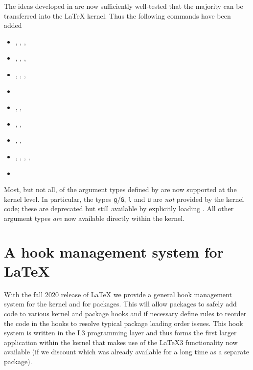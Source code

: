 \documentclass{ltnews}
\begin{document}
The ideas developed in  are now sufficiently well-tested
that the majority can be transferred into the \LaTeX{} kernel. Thus
the following commands have been added
\begin{itemize}
  \item {}, ,
    , 
  \item {}, ,
    , 
  \item {}, ,
    , 
  \item {} 
  \item {}, , 
  \item {}, , 
  \item {}, , 
  \item {}, , ,
    , 
  \item {}
\end{itemize}

Most, but not all, of the argument types defined by  are
now supported at the kernel level. In particular, the types
\texttt{g}/\texttt{G}, \texttt{l} and \texttt{u} are \emph{not} provided by
the kernel code; these are deprecated but still available by
explicitly loading . All other argument types \emph{are}
now available directly within the \LaTeXe{} kernel.






\section{A hook management system for \LaTeX{}}

With the fall 2020 release of \LaTeX{} we provide a general hook
management system for the kernel and for packages. This will allow
packages to safely add code to various kernel and package hooks and if
necessary define rules to reorder the code in the hooks to resolve
typical package loading order issues.  This hook system is written in
the L3 programming layer and thus forms the first larger application
within the kernel that makes use of the \LaTeX3 functionality now
available (if we discount  which was already available for
a long time as a separate package).
\end{document}
